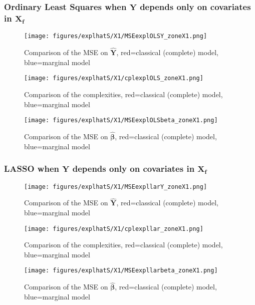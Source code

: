 \documentclass[12pt,a4paper]{report}
\begin{document}
 	
 

\newpage
\subsubsection{Ordinary Least Squares when $\boldsymbol{Y}$ depends only on covariates in $\boldsymbol{X_{f}}$}

	\begin{figure}[h!]
	\centering
		  \texttt{[image: figures/explhatS/X1/MSEexplOLSY\_zoneX1.png]}
		\caption{Comparison of the MSE on $\hat{\boldsymbol{Y}}$, red=classical (complete) model, blue=marginal model}\label{MSEexplOLSY_zoneX1}
	\end{figure}
	\begin{figure}[h!]
	\centering
		  \texttt{[image: figures/explhatS/X1/cplexplOLS\_zoneX1.png]}
		\caption{Comparison of the complexities, red=classical (complete) model, blue=marginal model}\label{cplexplOLS_zoneX1}
	\end{figure}
	\begin{figure}[h!]
	\centering
		  \texttt{[image: figures/explhatS/X1/MSEexplOLSbeta\_zoneX1.png]}
		\caption{Comparison of the MSE on $\hat{\boldsymbol{\beta}}$, red=classical (complete) model, blue=marginal model}\label{MSEexplOLSbeta_zoneX1}
	\end{figure}
	\FloatBarrier
\newpage
\subsubsection{LASSO when $\boldsymbol{Y}$ depends only on covariates in $\boldsymbol{X_f}$}

	\begin{figure}[h!]
	\centering
		  \texttt{[image: figures/explhatS/X1/MSEexpllarY\_zoneX1.png]}
		\caption{Comparison of the MSE on $\hat{\boldsymbol{Y}}$, red=classical (complete) model, blue=marginal model}\label{MSEexpllarY_zoneX1}
	\end{figure}
	\begin{figure}[h!]
	\centering
		  \texttt{[image: figures/explhatS/X1/cplexpllar\_zoneX1.png]}
		\caption{Comparison of the complexities, red=classical (complete) model, blue=marginal model}\label{cplexpllar_zoneX1}
	\end{figure}
	\begin{figure}[h!]
	\centering
		  \texttt{[image: figures/explhatS/X1/MSEexpllarbeta\_zoneX1.png]}
		\caption{Comparison of the MSE on $\hat{\boldsymbol{\beta}}$, red=classical (complete) model, blue=marginal model}\label{MSEexpllarbeta_zoneX1}
	\end{figure}
	\FloatBarrier
\newpage
\end{document}
